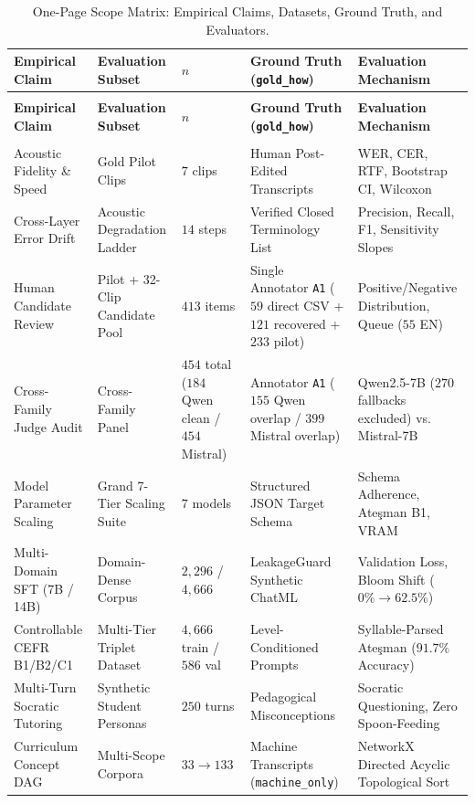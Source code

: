 \documentclass[a4paper,12pt]{report}
\begin{document}
{\footnotesize
\setlength{\tabcolsep}{4pt}
\begin{longtable}{@{}>{\RaggedRight\arraybackslash}p{27mm}>{\RaggedRight\arraybackslash}p{29mm}>{\RaggedRight\arraybackslash}p{20mm}>{\RaggedRight\arraybackslash}p{29mm}>{\RaggedRight\arraybackslash}p{29mm}@{}}
\caption{One-Page Scope Matrix: Empirical Claims, Datasets, Ground Truth, and Evaluators.}
\label{tab:scope_matrix}\\
\toprule
\textbf{Empirical Claim} & \textbf{Evaluation Subset} & \textbf{$n$} & \textbf{Ground Truth (\texttt{gold\_how})} & \textbf{Evaluation Mechanism} \\
\midrule
\endfirsthead
\multicolumn{5}{l}{\emph{Table \thetable\ (continued)}}\\
\toprule
\textbf{Empirical Claim} & \textbf{Evaluation Subset} & \textbf{$n$} & \textbf{Ground Truth (\texttt{gold\_how})} & \textbf{Evaluation Mechanism} \\
\midrule
\endhead
\midrule
\multicolumn{5}{r}{\emph{Continued on next page}}\\
\endfoot
\bottomrule
\endlastfoot
Acoustic Fidelity \& Speed & Gold Pilot Clips & $7$ clips & Human Post-Edited Transcripts & WER, CER, RTF, Bootstrap CI, Wilcoxon \\
Cross-Layer Error Drift & Acoustic Degradation Ladder & $14$ steps & Verified Closed Terminology List & Precision, Recall, F1, Sensitivity Slopes \\
Human Candidate Review & Pilot + 32-Clip Candidate Pool & $413$ items & Single Annotator \texttt{A1} ($59$ direct CSV + $121$ recovered + $233$ pilot) & Positive/Negative Distribution, Queue ($55$ EN) \\
Cross-Family Judge Audit & Cross-Family Panel & $454$ total ($184$ Qwen clean / $454$ Mistral) & Annotator \texttt{A1} ($155$ Qwen overlap / $399$ Mistral overlap) & Qwen2.5-7B ($270$ fallbacks excluded) vs. Mistral-7B \\
Model Parameter Scaling & Grand 7-Tier Scaling Suite & $7$ models & Structured JSON Target Schema & Schema Adherence, Ate\c{s}man B1, VRAM \\
Multi-Domain SFT (7B / 14B) & Domain-Dense Corpus & $2{,}296$ / $4{,}666$ & LeakageGuard Synthetic ChatML & Validation Loss, Bloom Shift ($0\%\to 62.5\%$) \\
Controllable CEFR B1/B2/C1 & Multi-Tier Triplet Dataset & $4{,}666$ train / $586$ val & Level-Conditioned Prompts & Syllable-Parsed Ate\c{s}man ($91.7\%$ Accuracy) \\
Multi-Turn Socratic Tutoring & Synthetic Student Personas & $250$ turns & Pedagogical Misconceptions & Socratic Questioning, Zero Spoon-Feeding \\
Curriculum Concept DAG & Multi-Scope Corpora & $33\to 133$ & Machine Transcripts (\texttt{machine\_only}) & NetworkX Directed Acyclic Topological Sort \\
\end{longtable}
}
\end{document}
